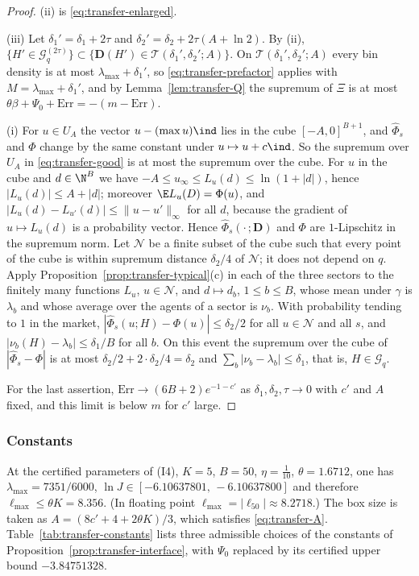 \begin{proof}
(ii) is \eqref{eq:transfer-enlarged}.

(iii) Let $\delta_1'=\delta_1+2\tau$ and $\delta_2'=\delta_2+2\tau(A+\ln2)$. By (ii),
$\{H'\in\mathcal G_q^{(2\tau)}\}\subset\{\mathbf D(H')\in\mathcal T(\delta_1',\delta_2';A)\}$.
On $\mathcal T(\delta_1',\delta_2';A)$ every bin density is at most
$\lambda_{\max}+\delta_1'$, so \eqref{eq:transfer-prefactor} applies with
$M=\lambda_{\max}+\delta_1'$, and by Lemma~\ref{lem:transfer-Q} the supremum of $\Xi$ is at
most $\theta\beta+\Psi_0+\mathrm{Err}=-(m-\mathrm{Err})$.

(i) For $u\in U_A$ the vector $u-(\max u)\ind$ lies in the cube $[-A,0]^{B+1}$, and
$\widehat\Phi_s$ and $\Phi$ change by the same constant under $u\mapsto u+c\ind$. So the
supremum over $U_A$ in \eqref{eq:transfer-good} is at most the supremum over the cube. For $u$
in the cube and $d\in\N^B$ we have $-A\le u_\infty\le L_u(d)\le\ln(1+|d|)$, hence
$|L_u(d)|\le A+|d|$; moreover $\E L_u(D)=\Phi(u)$, and
$|L_u(d)-L_{u'}(d)|\le\|u-u'\|_\infty$ for all $d$, because the gradient of $u\mapsto L_u(d)$ is
a probability vector. Hence $\widehat\Phi_s(\cdot\,;\mathbf D)$ and $\Phi$ are $1$-Lipschitz in
the supremum norm. Let $\mathcal N$ be a finite subset of the cube such that every point of
the cube is within supremum distance $\delta_2/4$ of $\mathcal N$; it does not depend on $q$.
Apply Proposition~\ref{prop:transfer-typical}(c) in each of the three sectors to the finitely
many functions $L_u$, $u\in\mathcal N$, and $d\mapsto d_b$, $1\le b\le B$, whose mean under
$\gamma$ is $\lambda_b$ and whose average over the agents of a sector is $\nu_b$. With
probability tending to $1$ in the market,
$|\widehat\Phi_s(u;H)-\Phi(u)|\le\delta_2/2$ for all $u\in\mathcal N$ and all $s$, and
$|\nu_b(H)-\lambda_b|\le\delta_1/B$ for all $b$. On this event the supremum over the cube of
$|\widehat\Phi_s-\Phi|$ is at most $\delta_2/2+2\cdot\delta_2/4=\delta_2$ and
$\sum_b|\nu_b-\lambda_b|\le\delta_1$, that is, $H\in\mathcal G_q$.

For the last assertion, $\mathrm{Err}\to(6B+2)e^{-1-c'}$ as $\delta_1,\delta_2,\tau\to0$ with
$c'$ and $A$ fixed, and this limit is below $m$ for $c'$ large.
\end{proof}

\subsubsection*{Constants}

At the certified parameters of (I4), $K=5$, $B=50$, $\eta=\tfrac1{10}$, $\theta=1.6712$, one
has $\lambda_{\max}=7351/6000$, $\ln J\in[-6.10637801,\,-6.10637800]$ and therefore
$\ell_{\max}\le\theta K=8.356$. (In floating point $\ell_{\max}=|\ell_{50}|\approx8.2718$.) The
box size is taken as $A=(8c'+4+2\theta K)/3$, which satisfies \eqref{eq:transfer-A}.
Table~\ref{tab:transfer-constants} lists three admissible choices of the constants of
Proposition~\ref{prop:transfer-interface}, with $\Psi_0$ replaced by its certified upper bound
$-3.84751328$.

